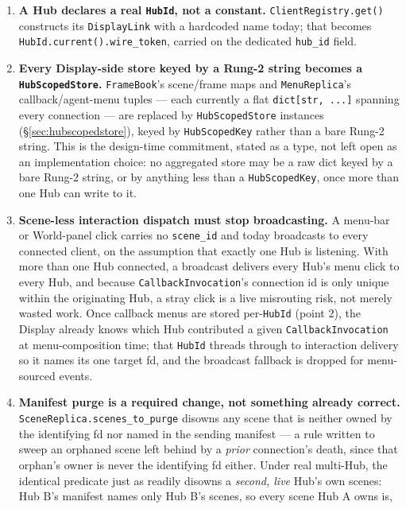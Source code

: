 \documentclass[a4paper,10pt]{article}
\newcommand{\field}[1]{\texttt{#1}}
\begin{document}
\begin{enumerate}
  \item \textbf{A Hub declares a real \texttt{HubId}, not a constant.}
    \texttt{ClientRegistry.get()} constructs its \texttt{DisplayLink} with
    a hardcoded name today; that becomes \field{HubId.current().wire\_token},
    carried on the dedicated \field{hub\_id} field.
  \item \textbf{Every Display-side store keyed by a Rung-2 string becomes
    a \texttt{HubScopedStore}.}  \texttt{FrameBook}'s scene/frame maps and
    \texttt{MenuReplica}'s callback/agent-menu tuples --- each currently a
    flat \texttt{dict[str, ...]} spanning every connection --- are
    replaced by \texttt{HubScopedStore} instances
    (\S\ref{sec:hubscopedstore}), keyed by \texttt{HubScopedKey} rather
    than a bare Rung-2 string.  This is the design-time commitment, stated
    as a type, not left open as an implementation choice: no aggregated
    store may be a raw dict keyed by a bare Rung-2 string, or by anything
    less than a \texttt{HubScopedKey}, once more than one Hub can write to
    it.
  \item \textbf{Scene-less interaction dispatch must stop broadcasting.}  A
    menu-bar or World-panel click carries no \field{scene\_id} and today
    broadcasts to every connected client, on the assumption that exactly
    one Hub is listening.  With more than one Hub connected, a broadcast
    delivers every Hub's menu click to every Hub, and because
    \texttt{CallbackInvocation}'s connection id is only unique within the
    originating Hub, a stray click is a live misrouting risk, not merely
    wasted work.  Once callback menus are stored per-\texttt{HubId} (point
    2), the Display already knows which Hub contributed a given
    \texttt{CallbackInvocation} at menu-composition time; that
    \texttt{HubId} threads through to interaction delivery so it names its
    one target fd, and the broadcast fallback is dropped for menu-sourced
    events.
  \item \textbf{Manifest purge is a required change, not something already
    correct.}  \texttt{SceneReplica.scenes\_to\_purge} disowns any scene
    that is neither owned by the identifying fd nor named in the sending
    manifest --- a rule written to sweep an orphaned scene left behind by a
    \emph{prior} connection's death, since that orphan's owner is never the
    identifying fd either.  Under real multi-Hub, the identical predicate
    just as readily disowns a \emph{second, live} Hub's own scenes: Hub
    B's manifest names only Hub B's scenes, so every scene Hub A owns is,

\end{enumerate}
\end{document}
